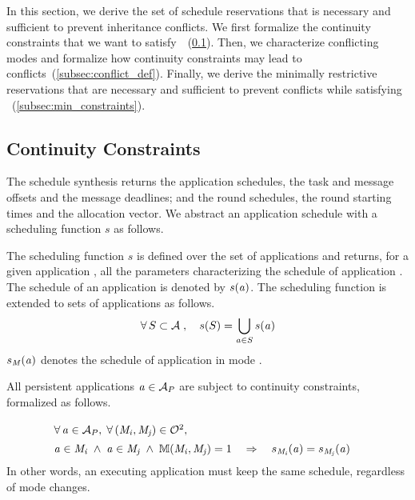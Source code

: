 In this section, we derive the set of schedule reservations that is necessary and sufficient to prevent inheritance conflicts.
We first formalize the continuity constraints that we want to satisfy~\objB~(\cref{subsec:continuity_constraints}).
Then, we characterize conflicting modes and formalize how continuity constraints may lead to conflicts~(\cref{subsec:conflict_def}).
Finally, we derive the minimally restrictive reservations that are necessary and sufficient to prevent conflicts while satisfying \objB~(\cref{subsec:min_constraints}).

\subsection{Continuity Constraints}
\label{subsec:continuity_constraints}

The schedule synthesis returns the application schedules, \ie the task and message offsets and the message deadlines; and the round schedules, \ie the round starting times and the allocation vector.
We abstract an application schedule with a scheduling function $s$ as follows.

\begin{definition}
\label{def:sched_funtion}
The scheduling function $s$ is defined over the set of applications \appset and returns, for a given application \app, all the parameters characterizing the schedule of application \app. The schedule of an application \app is denoted by $s(\mathit{a_{}})$.
The scheduling function is extended to sets of applications as follows.
\begin{equation*}
\forall \, S \subset \mathcal{A} \; , \quad s(S) = \bigcup_{\mathit{a_{}}\in S} s(\mathit{a_{}})
\end{equation*}
$s_\mathit{M_{}}(\mathit{a_{}})$ denotes the schedule of application \app in mode \modeany.
\end{definition}

All persistent applications $\mathit{a_{}} \in \mathcal{A}_{P}$ are subject to continuity constraints,  formalized as follows.
\begin{definition}
\label{def:continuity_constraint}
\begin{align}
\intertext{$\forall\, \mathit{a_{}} \in \mathcal{A}_{P}, \; \forall\, (\mathit{M_{i}}, \mathit{M_{j}}) \in \mathcal{O}^2,$}
& \mathit{a_{}} \in \mathit{M_{i}} \; \wedge \; \mathit{a_{}} \in \mathit{M_{j}} \; \wedge \; \mathbb{M}(\mathit{M_{i}},\mathit{M_{j}}) = 1
	\quad \Rightarrow \quad
	s_\mathit{M_{i}}(\mathit{a_{}}) = s_\mathit{M_{j}}(\mathit{a_{}})
\end{align}
In other words, an executing application must keep the same schedule, regardless of mode changes.
\end{definition}


